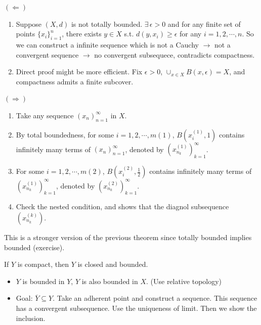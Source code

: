 \documentclass[12pt]{article}
\begin{document}
\begin{pfbox}
$(\Leftarrow)$
\begin{enumerate}
    \item Suppose $(X,d)$ is not totally bounded. $\exists\,\epsilon>0$ and for any finite set of points $\{x_i\}^n_{i=1}$, there exists $y\in X$ s.t. $d(y,x_i)\geq \epsilon$ for any $i=1,2,\cdots,n$.
    So we can construct a infinite sequence which is not a Cauchy $\rightarrow$ not a convergent sequence $\rightarrow$ no convergent subsequece, contradicts compactness.
    \item Direct proof might be more efficient. Fix $\epsilon>0$, $\cup_{x\in X}B(x,\epsilon) = X$, and compactness admits a finite subcover. 
\end{enumerate}
$(\Rightarrow)$
\begin{enumerate}
    \item Take any sequence $(x_n)^\infty_{n=1}$ in $X$.
    \item By total boundedness, for some $i=1,2,\cdots,m(1)$, $B(x^{(1)}_i, 1)$ contains infinitely many terms of $(x_n)^\infty_{n=1}$, denoted by $(x^{(1)}_{n_k})^\infty_{k=1}$.
    \item For some $i=1,2,\cdots,m(2)$, $B(x^{(2)}_i, \frac{1}{2})$ contains infinitely many terms of $(x^{(1)}_{n_k})^\infty_{k=1}$, denoted by $(x^{(2)}_{n_k})^\infty_{k=1}$.
    \item Check the nested condition, and shows that the diagnol subsequence $(x^{(k)}_{n_k})$.
\end{enumerate}
\end{pfbox}

This is a stronger version of the previous theorem since totally bounded implies bounded (exercise).




\begin{theorem}
    If $Y$ is compact, then $Y$ is closed and bounded.
    \label{cpt is closed and bd}
\end{theorem}

\begin{pfbox}
\begin{itemize}
    \item $Y$ is bounded in $Y$, $Y$ is also bounded in $X$. (Use relative topology)
    \item Goal: $\overline{Y}\subseteq Y$. Take an adherent point and construct a sequence. This sequence has a convergent subsequence. Use the uniqueness of limit. Then we show the inclusion.
\end{itemize}    
\end{pfbox}
\end{document}
